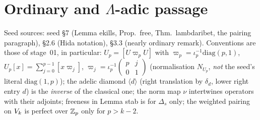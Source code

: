 \section{Ordinary and $\Lambda$-adic passage}\label{sec:stage-04}
\providecommand{\NUp}{N_{U_p}}                 %
\providecommand{\Kp}[1]{K_{#1}}                %
\providecommand{\Kpp}[1]{K'_{#1}}              %
\providecommand{\TordB}{\T^{\mathrm{ord}}_B}   %

Seed sources: seed \S7 (Lemma ekills, Prop.~free, Thm.~lambdaribet, the pairing paragraph), \S2.6 (Hida
notation), \S3.3 (nearly ordinary remark). Conventions are those of stage~01, in particular:
$U_p=[U\varpi_pU]$ with $\varpi_p=\iota_p^{-1}\mathrm{diag}(p,1)$, $U_p[x]=\sum_{j=0}^{p-1}[x\varpi_j]$,
$\varpi_j=\iota_p^{-1}\left(\begin{smallmatrix}p&j\\0&1\end{smallmatrix}\right)$ (normalisation $\NUp$, \emph{not} the seed's literal
$\mathrm{diag}(1,p)$); the adelic diamond $\langle d\rangle$ (right translation by $\delta_d$, lower right entry $d$) is the
\emph{inverse} of the classical one; the norm map $\nu$ intertwines operators with their adjoints; freeness in Lemma stab is for
$\Delta_s$ only; the weighted pairing on $V_k$ is perfect over $\mathbb{Z}_p$ only for $p>k-2$.

